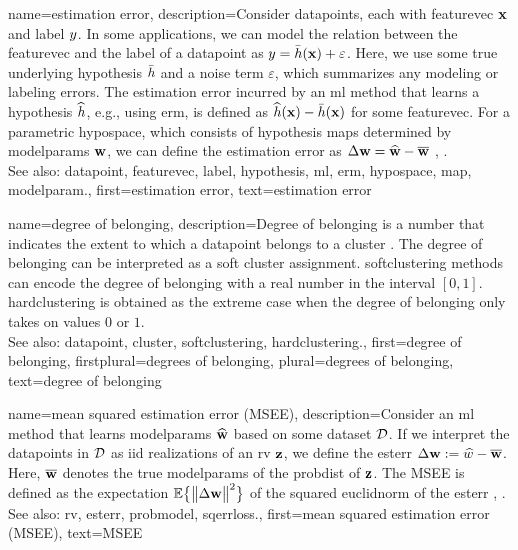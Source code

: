{name={estimation error},
	description={Consider \glspl{datapoint}, each with \gls{featurevec} ${\bf x}$ and \gls{label} 
		$y$. In some applications, we can model the relation between the \gls{featurevec} and the \gls{label}
		of a \gls{datapoint} as $y = \bar{h}({\bf x}) + \varepsilon$. Here, we 
		use some true underlying \gls{hypothesis} $\bar{h}$ and a noise term $\varepsilon$, 
		which summarizes any modeling or labeling errors. The estimation error incurred by an \gls{ml} 
		method that learns a \gls{hypothesis} $\widehat{h}$, e.g., using \gls{erm}, is defined as 
		$\widehat{h}({\bf x}) - \bar{h}({\bf x})$ for some \gls{featurevec}. 
		For a parametric \gls{hypospace}, which consists of \gls{hypothesis} \glspl{map} determined by 
		\glspl{modelparam} ${\bf w}$, we can define the estimation error as 
		$\Delta {\bf w} = \widehat{{\bf w}} - \overline{{\bf w}}$ \cite{kay}, \cite{hastie01statisticallearning}.
					\\ 
		See also: \gls{datapoint}, \gls{featurevec}, \gls{label}, \gls{hypothesis}, \gls{ml}, \gls{erm}, \gls{hypospace}, \gls{map}, \gls{modelparam}.},
	first={estimation error},
	text={estimation error} 
}

{name={degree of belonging}, 
	description={Degree of belonging is a number that indicates the extent to which a \gls{datapoint} 
		belongs to a \gls{cluster} \cite[Ch. 8]{MLBasics}. The degree of belonging can be 
		interpreted as a soft \gls{cluster} assignment. \Gls{softclustering} methods can 
		encode the degree of belonging with a real number in the interval $[0,1]$. 
		\Gls{hardclustering} is obtained as the extreme case when the degree of belonging 
		only takes on values $0$ or $1$.
					\\ 
		See also: \gls{datapoint}, \gls{cluster}, \gls{softclustering}, \gls{hardclustering}.}, 
	first={degree of belonging},
	firstplural={degrees of belonging},
	plural={degrees of belonging},
	text={degree of belonging} 
}

{name={mean squared estimation error (MSEE)},
	description={Consider an \gls{ml} method that 
		learns \glspl{modelparam} $\widehat{{\bf w}}$ based on some \gls{dataset} $\mathcal{D}$. 
		If we interpret the \glspl{datapoint} in $\mathcal{D}$ as \gls{iid} \glspl{realization} of an \gls{rv} ${\bf z}$, 
		we define the \gls{esterr} $\Delta {\bf w} := \widehat{w} - \overline{{\bf w}}$. 
		Here, $\overline{{\bf w}}$ denotes the true \glspl{modelparam} of the \gls{probdist} 
		of ${\bf z}$. The MSEE is 
		defined as the \gls{expectation} $\mathbb{E} \big\{ \big\| \Delta {\bf w} \big\|^{2} \big\}$ of the 
		squared \gls{euclidnorm} of the \gls{esterr} \cite{LC}, \cite{kay}.
					\\ 
		See also: \gls{rv}, \gls{esterr}, \gls{probmodel}, \gls{sqerrloss}.},
	first={mean squared estimation error (MSEE)},
	text={MSEE} 
}

